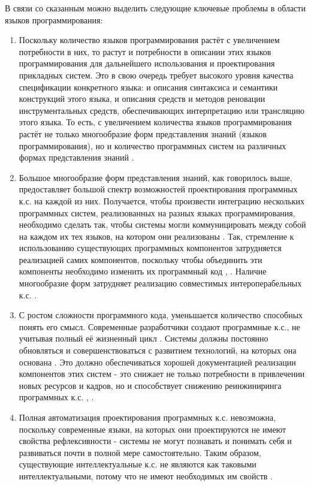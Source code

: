 В связи со сказанным можно выделить следующие ключевые проблемы в области языков программирования:
\begin{enumerate}
    \item Поскольку количество языков программирования растёт с увеличением потребности в них, то растут и потребности в описании этих языков программирования для дальнейшего использования и проектирования прикладных систем. Это в свою очередь требует высокого уровня качества спецификации конкретного языка: и описания синтаксиса и семантики конструкций этого языка, и описания средств и методов реновации инструментальных средств, обеспечивающих интерпретацию или трансляцию этого языка. То есть, с увеличением количества языков программирования растёт не только многообразие форм представления знаний (языков программирования), но и количество программных систем на различных формах представления знаний \cite{Zapata2010}.
    \item Большое многообразие форм представления знаний, как говорилось выше, предоставляет большой спектр возможностей проектирования программных к.с. на каждой из них. Получается, чтобы произвести интеграцию нескольких программных систем, реализованных на разных языках программирования, необходимо сделать так, чтобы системы могли коммуницировать между собой на каждом их тех языков, на котором они реализованы \cite{Golenkov2019a}. Так, стремление к использованию существующих программных компонентов затрудняется реализацией самих компонентов, поскольку чтобы объединить эти компоненты необходимо изменить их программный код \cite{Penta2020}, \cite{Scalabrino2016}. Наличие многообразие форм затрудняет реализацию совместимых интероперабельных к.с. \cite{Golenkov2012}.
    \item С ростом сложности программного кода, уменьшается количество способных понять его смысл. Современные разработчики создают программные к.с., не учитывая полный её жизненный цикл \cite{Brooks2021}. Системы должны постоянно обновляться и совершенствоваться с развитием технологий, на которых она основана \cite{Sellitto2022}. Это должно обеспечиваться хорошей документацией реализации компонентов этих систем - это снижает не только потребности в привлечении новых ресурсов и кадров, но и способствует снижению реинжиниринга программных к.с. \cite{Penta2020}, \cite{Scalabrino2016}.
    \item Полная автоматизация проектирования программных к.с. невозможна, поскольку современные языки, на которых они проектируются не имеют свойства рефлексивности - системы не могут познавать и понимать себя и развиваться почти в полной мере самостоятельно. Таким образом, существующие интеллектуальные к.с. не являются как таковыми интеллектуальными, потому что не имеют необходимых им свойств \cite{GolenkovPrinciples2021}.

\end{enumerate}
